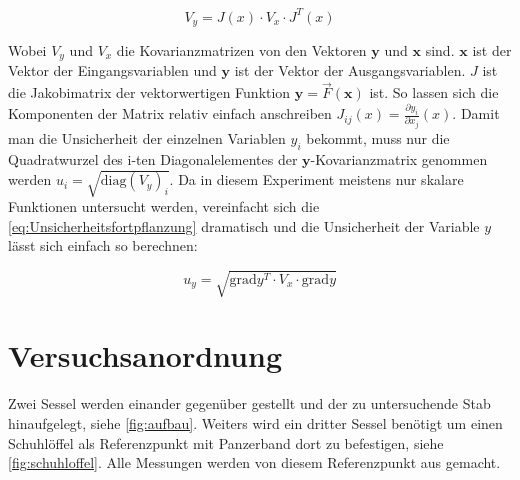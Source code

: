 \documentclass[11pt,ngerman]{scrartcl}
\begin{document}
\begin{equation}
    \label{eq:Unsicherheitsfortpflanzung}
    V_y = J(x) \cdot V_x \cdot J^{T}(x)
\end{equation}

Wobei $V_y$ und $V_x$ die Kovarianzmatrizen von den Vektoren $\bm{y}$ und $\bm{x}$ sind.
$\bm{x}$ ist der Vektor der Eingangsvariablen und $\bm{y}$ ist der Vektor der Ausgangsvariablen.
$J$ ist die Jakobimatrix der vektorwertigen Funktion $\bm{y} = \vec{F}(\bm{x})$ ist.
So lassen sich die Komponenten der Matrix relativ einfach anschreiben $J_{ij}(x) = \frac{\partial{y_i}}{\partial{x_j}}(x)$.
Damit man die Unsicherheit der einzelnen Variablen $y_i$ bekommt, muss nur die Quadratwurzel des i-ten Diagonalelementes der 
$\bm{y}$-Kovarianzmatrix genommen werden $u_i= \sqrt{\mathrm{diag}(V_y)_i}$.
Da in diesem Experiment meistens nur skalare Funktionen untersucht werden, vereinfacht
sich die \autoref{eq:Unsicherheitsfortpflanzung} dramatisch und die Unsicherheit
der Variable $y$ lässt sich einfach so berechnen:

\begin{equation}
    \label{eq:graduncentainty}
    u_y = \sqrt{\mathrm{grad} y^T \cdot V_x \cdot \mathrm{grad} y}
\end{equation}

\section{Versuchsanordnung}
\label{sec:versuchsanordnung}
Zwei Sessel werden einander gegenüber gestellt und der zu untersuchende Stab
hinaufgelegt, siehe \autoref{fig:aufbau}. Weiters wird ein dritter Sessel
benötigt um einen Schuhlöffel als Referenzpunkt mit
Panzerband dort zu befestigen, siehe
\autoref{fig:schuhloffel}. Alle Messungen werden von diesem Referenzpunkt aus
gemacht.
\end{document}
